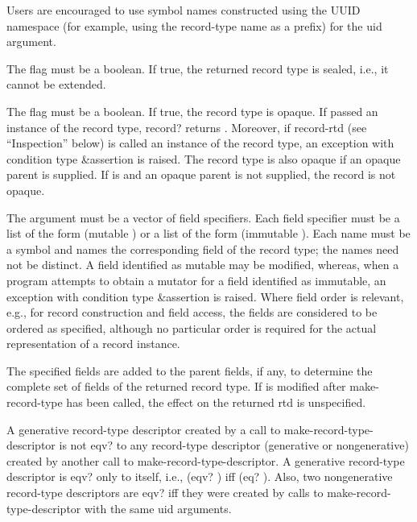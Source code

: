 \begin{entry}{%
}
\begin{note}   
  Users are encouraged to use symbol names
  constructed using the UUID namespace (for example, using the
  record-type name as a prefix) for the uid argument.
\end{note}

The  flag must be a boolean. If true, the returned record type
is sealed, i.e., it cannot be extended.

The  flag must be a boolean. If true, the record type
is opaque.
If passed an instance of the record type,
{\cf record?} returns
\schfalse{}.  Moreover, if {\cf record-rtd} (see ``Inspection'' below)
is called an instance of the record type, 
an exception with condition type {\cf\&assertion} is raised.
The record type is also opaque if an opaque parent is
supplied.  If  is \schfalse{} and an opaque parent is not
supplied, the record is not opaque.

The  argument must be a vector of field specifiers. Each
field specifier must be a list of the form {\cf (mutable )}
or a list of the form {\cf (immutable )}.
Each name must be a symbol and names the corresponding field of the record
type; the names need not be distinct.  A field identified as mutable may
be modified, whereas, when a program attempts to obtain a mutator for a field identified
as immutable, an exception with condition type {\cf\&assertion} is raised.
Where field order is relevant, e.g., for record construction and field
access, the fields are considered to be ordered as specified, although
no particular order is required for the actual representation of a
record instance.

The specified fields are added to the parent fields, if any, to determine
the complete set of fields of the returned record type.
If  is modified after {\cf make-record-type}
has been called, the effect on the returned
rtd is unspecified.

A generative record-type descriptor created by a call to {\cf
  make-record-type-descriptor} is not {\cf eqv?} to any record-type
descriptor (generative or nongenerative) created by another call to
{\cf make-record-type-descriptor}. A generative record-type descriptor
is {\cf eqv?}  only to itself, i.e., {\cf (eqv?  )} iff
{\cf (eq?  )}.
Also, two nongenerative record-type descriptors are {\cf eqv?} iff they were
created by calls to {\cf make-record-type-descriptor} with the same
uid arguments.
\end{entry}

